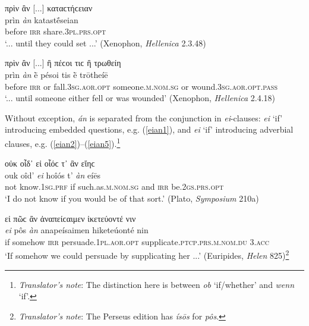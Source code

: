 \begin{exe}
\ex πρὶν ἂν {[}...{]} καταϲτήϲειαν\\
\gll prìn \emph{àn} katastḗseian\\
before \textsc{irr} share.\textsc{3pl.prs.opt}\\
\trans `... until they could set ...' (Xenophon, \textit{Hellenica} 2.3.48)
\label{temporalan3}
\end{exe}

\begin{exe}
\ex πρὶν ἂν {[}...{]} ἢ πέϲοι τιϲ ἢ τρωθείη\\
\gll prìn \emph{àn} ḕ pésoi tis ḕ trōtheíē\\
before \textsc{irr} or fall.\textsc{3sg.aor.opt} someone.\textsc{m.nom.sg} or wound.\textsc{3sg.aor.opt.pass}\\
\trans `... until someone either fell or was wounded' (Xenophon, \textit{Hellenica} 2.4.18)
\label{temporalan4}
\end{exe}

Without exception, \emph{án} is separated from the conjunction in  \emph{ei}-clauses: \emph{ei} `if' introducing embedded questions, e.g. (\ref{eian1}), and \emph{ei} `if' introducing adverbial clauses, e.g. (\ref{eian2})--(\ref{eian5}).\footnote{\emph{Translator's note}: The distinction here is between  \textit{ob} `if/whether' and \textit{wenn} `if'.}

\begin{exe}
\ex οὐκ οἶδ᾽ εἰ οἷόϲ τ᾽ ἂν εἴηϲ\\
\gll ouk oîd' \emph{ei} hoîós t' \emph{àn} eíēs\\
not know.\textsc{1sg.prf} if such.as\textsc{.m.nom.sg} and \textsc{irr} be.\textsc{2gs.prs.opt}\\
\trans `I do not know if you would be of that sort.' (Plato, \textit{Symposium} 210a)
\label{eian1}
\end{exe}

\begin{exe}
\ex εἰ πῶϲ ἂν ἀναπείϲαιμεν ἱκετεύοντέ νιν\\
\gll \emph{ei} pôs \emph{àn} anapeísaimen hiketeúonté nin\\
if somehow \textsc{irr} persuade.\textsc{1pl.aor.opt} supplicate.\textsc{ptcp.prs.m.nom.du} \textsc{3.acc}\\
\trans `If somehow we could persuade by supplicating her ...' (Euripides, \textit{Helen} 825)\footnote{\emph{Translator's note}: The Perseus edition has \textit{ísōs} for \textit{pôs}.}
\label{eian2}
\end{exe}

